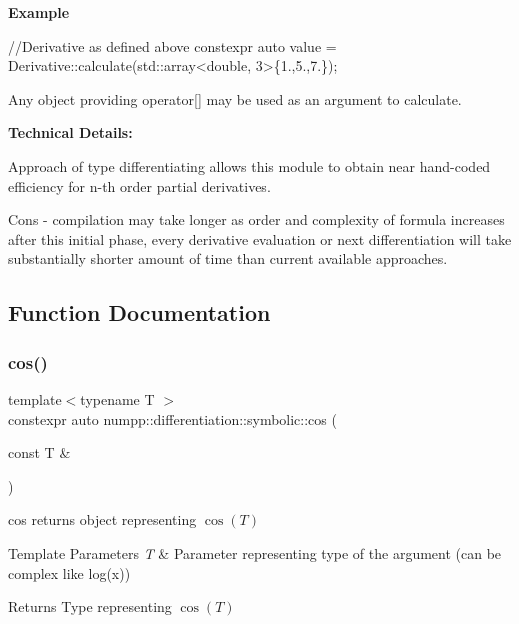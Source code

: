 {\bfseries Example}


\begin{DoxyCode}
\textcolor{comment}{//Derivative as defined above}
constexpr \textcolor{keyword}{auto} value = Derivative::calculate(std::array<double, 3>\{1.,5.,7.\});
\end{DoxyCode}


Any object providing operator\mbox{[}\mbox{]} may be used as an argument to calculate.

{\bfseries Technical Details\+:}

Approach of type differentiating allows this module to obtain near hand-\/coded efficiency for n-\/th order partial derivatives.

Cons -\/ compilation may take longer as order and complexity of formula increases after this initial phase, every derivative evaluation or next differentiation will take substantially shorter amount of time than current available approaches. 

\subsection{Function Documentation}
\mbox{\label{group__numpp__differentiation__symbolic_gad414fd158986bf7fff7e258a6ebf182c}} 
\subsubsection{\texorpdfstring{cos()}{cos()}}
{\footnotesize\ttfamily template$<$typename T $>$ \\
constexpr auto numpp\+::differentiation\+::symbolic\+::cos (\begin{DoxyParamCaption}\item[{const T \&}]{ }\end{DoxyParamCaption})}

cos returns object representing $ \cos(T) $ 
\begin{DoxyTemplParams}{Template Parameters}
{\em T} & Parameter representing type of the argument (can be complex like log(x))\\
\hline
\end{DoxyTemplParams}
\begin{DoxyReturn}{Returns}
Type representing $ \cos(T) $
\end{DoxyReturn}
\mbox{\label{group__numpp__differentiation__symbolic_ga4bcf2dcdbc549b58c9fb7cd1b8c1cf70}} 
